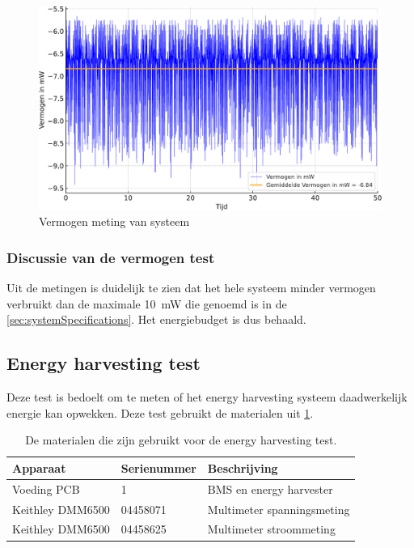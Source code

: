 \begin{figure}[!htbp]
    \centering
    \includegraphics[width=.85\textwidth]{img/vermogensMeting.pdf}
    \caption{Vermogen meting van systeem}
    \label{fig:vermogenMeting}
\end{figure}

\subsubsection{Discussie van de vermogen test}
Uit de metingen is duidelijk te zien dat het hele systeem minder vermogen verbruikt dan de maximale \qty{10}{\milli\watt} die genoemd is in de \cref{sec:systemSpecifications}. Het energiebudget is dus behaald.


\subsection{Energy harvesting test}
Deze test is bedoelt om te meten of het energy harvesting systeem daadwerkelijk energie kan opwekken. Deze test gebruikt de materialen uit \cref{tab:testMaterialen4}.

\begin{table}[!htbp]
    \centering
    \begin{tabular}{l|l|l}
        Apparaat         & Serienummer & Beschrijving \\
        \hline
        Voeding PCB      & 1           & BMS en energy harvester    \\
        Keithley DMM6500 & 04458071    & Multimeter spanningsmeting \\
        Keithley DMM6500 & 04458625    & Multimeter stroommeting    \\
        \hline
    \end{tabular}
    \caption{De materialen die zijn gebruikt voor de energy harvesting test.}
    \label{tab:testMaterialen4}
\end{table}

